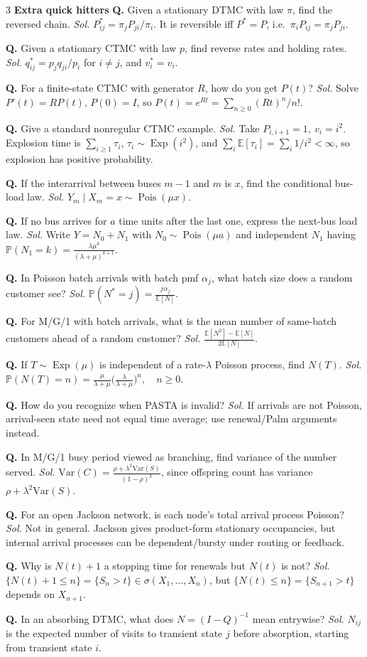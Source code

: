 \documentclass[a4paper,8pt,fleqn]{extarticle}
\newcommand{\E}{\mathbb{E}}
\newcommand{\PP}{\mathbb{P}}
\newcommand{\Var}{\mathrm{Var}}
\newcommand{\1}{\mathbf{1}}
\newcommand{\sub}[1]{\textbf{#1} }
\newcommand{\probq}[2]{\textbf{Q.} #1 \emph{Sol.} #2\par}
\DeclareMathOperator{\Pois}{Pois}
\DeclareMathOperator{\Exp}{Exp}
\begin{document}
\begin{multicols}{3}
\sub{Extra quick hitters}
\probq{Given a stationary DTMC with law \(\pi\), find the reversed chain.}{\(\displaystyle P^*_{ij}=\pi_jP_{ji}/\pi_i\). It is reversible iff \(P^*=P\), i.e.\ \(\pi_iP_{ij}=\pi_jP_{ji}\).}
\probq{Given a stationary CTMC with law \(p\), find reverse rates and holding rates.}{\(\displaystyle q^*_{ij}=p_jq_{ji}/p_i\) for \(i\ne j\), and \(v_i^*=v_i\).}
\probq{For a finite-state CTMC with generator \(R\), how do you get \(P(t)\)?}{Solve \(P'(t)=RP(t)\), \(P(0)=I\), so \(\displaystyle P(t)=e^{Rt}=\sum_{n\ge0}(Rt)^n/n!\).}
\probq{Give a standard nonregular CTMC example.}{Take \(P_{i,i+1}=1,\ v_i=i^2\). Explosion time is \(\sum_{i\ge1}\tau_i\), \(\tau_i\sim\Exp(i^2)\), and \(\sum_i\E[\tau_i]=\sum_i1/i^2<\infty\), so explosion has positive probability.}
\probq{If the interarrival between buses \(m-1\) and \(m\) is \(x\), find the conditional bus-load law.}{\(\displaystyle Y_m\mid X_m=x\sim\Pois(\mu x)\).}
\probq{If no bus arrives for \(a\) time units after the last one, express the next-bus load law.}{Write \(Y=N_0+N_1\) with \(N_0\sim\Pois(\mu a)\) and independent \(N_1\) having \(\PP(N_1=k)=\frac{\lambda\mu^k}{(\lambda+\mu)^{k+1}}\).}
\probq{In Poisson batch arrivals with batch pmf \(\alpha_j\), what batch size does a random customer see?}{\(\displaystyle \PP(N^*=j)=\frac{j\alpha_j}{\E[N]}\).}
\probq{For M/G/1 with batch arrivals, what is the mean number of same-batch customers ahead of a random customer?}{\(\displaystyle \frac{\E[N^2]-\E[N]}{2\E[N]}\).}
\probq{If \(T\sim\Exp(\mu)\) is independent of a rate-\(\lambda\) Poisson process, find \(N(T)\).}{\(\displaystyle \PP(N(T)=n)=\frac{\mu}{\lambda+\mu}\Big(\frac{\lambda}{\lambda+\mu}\Big)^n,\quad n\ge0.\)}
\probq{How do you recognize when PASTA is invalid?}{If arrivals are not Poisson, arrival-seen state need not equal time average; use renewal/Palm arguments instead.}
\probq{In M/G/1 busy period viewed as branching, find variance of the number served.}{\(\displaystyle \Var(C)=\frac{\rho+\lambda^2\Var(S)}{(1-\rho)^3}\), since offspring count has variance \(\rho+\lambda^2\Var(S)\).}
\probq{For an open Jackson network, is each node's total arrival process Poisson?}{Not in general. Jackson gives product-form stationary occupancies, but internal arrival processes can be dependent/bursty under routing or feedback.}
\probq{Why is \(N(t)+1\) a stopping time for renewals but \(N(t)\) is not?}{\(\{N(t)+1\le n\}=\{S_n>t\}\in\sigma(X_1,\dots,X_n)\), but \(\{N(t)\le n\}=\{S_{n+1}>t\}\) depends on \(X_{n+1}\).}
\probq{In an absorbing DTMC, what does \(N=(I-Q)^{-1}\) mean entrywise?}{\(N_{ij}\) is the expected number of visits to transient state \(j\) before absorption, starting from transient state \(i\).}

\end{multicols}
\end{document}
